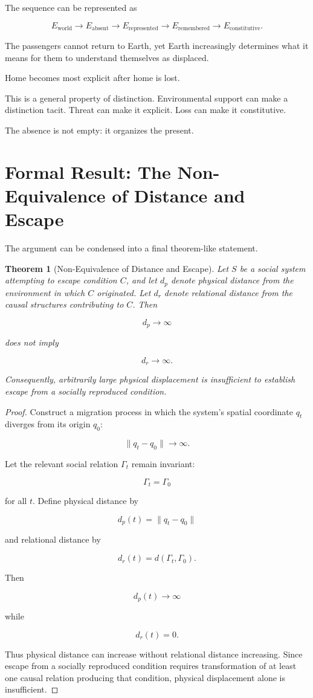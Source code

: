 \documentclass[11pt,oneside]{book}
\newtheorem{theorem}{Theorem}[chapter]
\theoremstyle{definition}
\theoremstyle{remark}
\begin{document}
The sequence can be represented as

\[
E_{\mathrm{world}}
\rightarrow
E_{\mathrm{absent}}
\rightarrow
E_{\mathrm{represented}}
\rightarrow
E_{\mathrm{remembered}}
\rightarrow
E_{\mathrm{constitutive}}.
\]

The passengers cannot return to Earth, yet Earth increasingly determines what it means for them to understand themselves as displaced.

Home becomes most explicit after home is lost.

This is a general property of distinction. Environmental support can make a distinction tacit. Threat can make it explicit. Loss can make it constitutive.

The absence is not empty: it organizes the present.

\section{Formal Result: The Non-Equivalence of Distance and Escape}

The argument can be condensed into a final theorem-like statement.

\begin{theorem}[Non-Equivalence of Distance and Escape]
Let \(S\) be a social system attempting to escape condition \(C\), and let \(d_p\) denote physical distance from the environment in which \(C\) originated. Let \(d_r\) denote relational distance from the causal structures contributing to \(C\). Then

\[
d_p\rightarrow\infty
\]

does not imply

\[
d_r\rightarrow\infty.
\]

Consequently, arbitrarily large physical displacement is insufficient to establish escape from a socially reproduced condition.
\end{theorem}

\begin{proof}
Construct a migration process in which the system's spatial coordinate \(q_t\) diverges from its origin \(q_0\):

\[
\|q_t-q_0\|\rightarrow\infty.
\]

Let the relevant social relation \(\Gamma_t\) remain invariant:

\[
\Gamma_t=\Gamma_0
\]

for all \(t\). Define physical distance by

\[
d_p(t)=\|q_t-q_0\|
\]

and relational distance by

\[
d_r(t)=d(\Gamma_t,\Gamma_0).
\]

Then

\[
d_p(t)\rightarrow\infty
\]

while

\[
d_r(t)=0.
\]

Thus physical distance can increase without relational distance increasing. Since escape from a socially reproduced condition requires transformation of at least one causal relation producing that condition, physical displacement alone is insufficient.
\end{proof}
\end{document}
